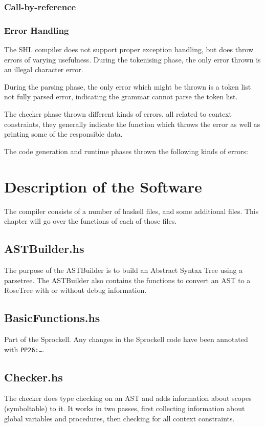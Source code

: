 \documentclass[twoside]{report}
\begin{document}
\subsection{Call-by-reference}
\label{def:call-by-reference}


\subsection{Error Handling}
\label{def:error_handling}
The SHL compiler does not support proper exception handling, but does throw errors of varying usefulness. During the tokenising phase, the only error thrown is an illegal character error.

During the parsing phase, the only error which might be thrown is a token list not fully parsed error, indicating the grammar cannot parse the token list.

The checker phase thrown different kinds of errors, all related to context constraints, they generally indicate the function which throws the error as well as printing some of the responsible data.

The code generation and runtime phases thrown the following kinds of errors:

\chapter{Description of the Software}
\label{description_of_the_software}
The compiler consists of a number of haskell files, and some additional files. This chapter will go over the functions of each of those files.

\section{ASTBuilder.hs}
The purpose of the ASTBuilder is to build an Abstract Syntax Tree using a parsetree. The ASTBuilder also contains the functions to convert an AST to a RoseTree with or without debug information.

\section{BasicFunctions.hs}
Part of the Sprockell. Any changes in the Sprockell code have been annotated with \texttt{PP26:\ldots}.

\section{Checker.hs}
The checker does type checking on an AST and adds information about scopes (symboltable) to it. It works in two passes, first collecting information about global variables and procedures, then checking for all context constraints.
\end{document}
